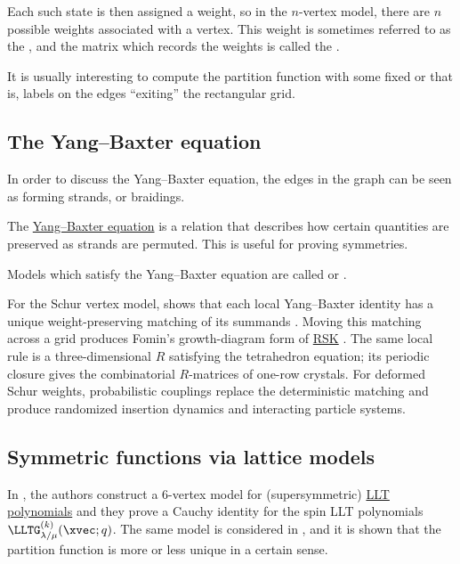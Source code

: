 Each such state is then assigned a weight, so in the $n$-vertex model, 
there are $n$ possible weights associated with a vertex.
This weight is sometimes referred to as the ,
and the matrix which records the weights is called the .

It is usually interesting to compute the partition function 
with some fixed  or 
that is, labels on the edges \enquote{exiting} the rectangular grid.


\subsection[latticeModelYangBaxter]{The Yang--Baxter equation}

In order to discuss the Yang--Baxter equation,
the edges in the graph can be seen as forming strands, or braidings.

The \hyperref[yangBaxter]{Yang--Baxter equation} is a relation that describes how
certain quantities are preserved as strands are permuted.
This is useful for proving symmetries.

Models which satisfy the Yang--Baxter equation are 
called  or . 

For the Schur vertex model,  shows that each local
Yang--Baxter identity has a unique weight-preserving matching of its summands
\cite[Lem.~3.2]{Petrov2026x}.  Moving this matching across a grid produces
Fomin's growth-diagram form of \hyperref[rskYangBaxter]{RSK}
\cite[Prop.~3.5]{Petrov2026x}.  The same local rule is a three-dimensional
$R$ satisfying the tetrahedron equation; its periodic closure gives the
combinatorial $R$-matrices of one-row crystals.  For deformed Schur weights,
probabilistic couplings replace the deterministic matching and produce
randomized insertion dynamics and interacting particle systems.


\subsection[latticeModelList]{Symmetric functions via lattice models}

In \cite{CurranFrechetteYostWolffZhangZhang2021x},
the authors construct a 6-vertex model for (supersymmetric) \hyperref[LLT]{LLT polynomials}
and they prove a Cauchy identity for the spin LLT polynomials $\LLTG^{(k)}_{\lambda/\mu}(\xvec;q)$.
The same model is considered in \cite{Hardt2021x}, and it is shown 
that the partition function is more or less unique in a certain sense.

